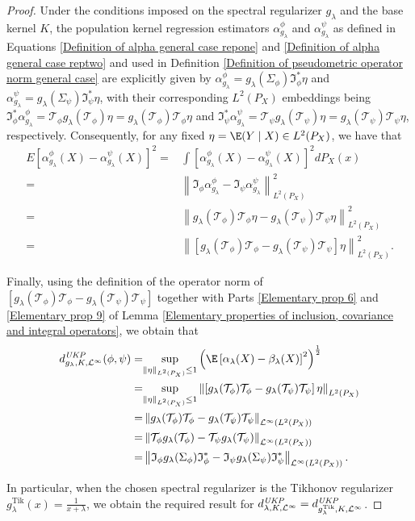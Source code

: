 \documentclass{article} %
\newcommand{\I}{\mathfrak{I}}
\newcommand{\repone}{\phi}
\newcommand{\reptwo}{\psi}
\newcommand{\Sone}{\Sigma_{\repone}}
\newcommand{\Stwo}{\Sigma_{\reptwo}}
\newcommand{\Tone}{\mathcal{T}_{\repone}}
\newcommand{\Ttwo}{\mathcal{T}_{\reptwo}}
\newcommand{\Irepone}{\I_{\repone}}
\newcommand{\Ireptwo}{\I_{\reptwo}}
\newcommand{\Ireponead}{\Irepone^{*}}
\newcommand{\Ireptwoad}{\Ireptwo^{*}}
\newcommand{\gl}{g_{\lambda}}
\newcommand{\glTik}{\gl^{\operatorname{Tik}}}
\newcommand{\norm}[1]{\left\|#1\right\|}
\newcommand{\LPtwo}{L^{2}(P_{X})}
\newcommand{\optwo}{\mathcal{L}^{\infty}(\LPtwo)}
\newcommand{\metricstname}{UKP }
\newcommand{\dop}{d_{\lambda,K,\mathcal{L}^{\infty}}^{\emph{\metricstname}}}
\newcommand{\dopgl}{d_{\gl,K,\mathcal{L}^{\infty}}^{\emph{\metricstname}}}
\newcommand{\dopglTik}{d_{\glTik,K,\mathcal{L}^{\infty}}^{\emph{\metricstname}}}
\theoremstyle{plain}
\begin{document}
\begin{proof}
        Under the conditions imposed on the spectral regularizer $\gl$ and the base kernel $K$,  the population kernel regression estimators $\alpha_{\gl}^{\repone}$ and $\alpha_{\gl}^{\reptwo}$ as defined in Equations \ref{Definition of alpha general case repone} and \ref{Definition of alpha general case reptwo} and used in Definition \ref{Definition of pseudometric operator norm general case} are explicitly given by $\alpha_{\gl}^{\repone} = \gl(\Sone) \Ireponead \eta$ and $\alpha_{\gl}^{\reptwo} = \gl(\Stwo) \Ireptwoad \eta$, with their corresponding $\LPtwo$ embeddings being $\Ireponead \alpha_{\gl}^{\repone}=\Tone \gl(\Tone) \eta =  \gl(\Tone) \Tone \eta$ and $\Ireptwoad \alpha_{\gl}^{\reptwo}=\Ttwo \gl(\Ttwo) \eta =  \gl(\Ttwo) \Ttwo \eta$, respectively. Consequently, for any fixed $\eta = \E(Y \mid X) \in \LPtwo$, we have that
    \[
    \begin{aligned}
    E\left[\alpha_{\gl}^{\repone}(X) -\alpha_{\gl}^{\reptwo}(X)\right]^{2}=& \int \left[\alpha_{\gl}^{\repone}(X) -\alpha_{\gl}^{\reptwo}(X)\right]^{2}dP_X(x)\\
    =&\norm{\Irepone \alpha_{\gl}^{\repone} - \Ireptwo \alpha_{\gl}^{\reptwo}}_{\LPtwo}^{2}\\
    =& \norm{\gl(\Tone)\Tone\eta - \gl(\Ttwo) \Ttwo \eta}_{\LPtwo}^{2}\\
    =& \norm{\left[\gl(\Tone)\Tone - \gl(\Ttwo) \Ttwo \right]\eta}_{\LPtwo}^{2}.
    \end{aligned}
    \]

    Finally, using the definition of the operator norm of $\left[\gl(\Tone)\Tone - \gl(\Ttwo) \Ttwo \right]$ together with Parts \ref{Elementary prop 6} and \ref{Elementary prop 9} of Lemma \ref{Elementary properties of inclusion, covariance and integral operators}, we obtain that
    \[
    \begin{aligned}
        \dopgl(\repone,\reptwo) =& \underset{\norm{\eta}_{\LPtwo} \leq 1}{\sup} \left(\E\left[\alpha_{\lambda}(X)-\beta_{\lambda}(X)\right]^{2}\right)^{\frac{1}{2}}\\
        =& \underset{\norm{\eta}_{\LPtwo} \leq 1}{\sup} \norm{\left[\gl(\Tone)\Tone - \gl(\Ttwo) \Ttwo \right]\eta}_{\LPtwo}\\
        =& \norm{\gl(\Tone) \Tone - \gl(\Ttwo) \Ttwo}_{\optwo} \\
         =& \norm{ \Tone \gl(\Tone) -  \Ttwo \gl(\Ttwo)}_{\optwo} \\
         =& \norm{ \Irepone \gl(\Sone) \Ireponead -  \Ireptwo \gl(\Stwo) \Ireptwoad }_{\optwo}.
    \end{aligned}
    \]

    In particular, when the chosen spectral regularizer is the Tikhonov regularizer $\glTik(x) = \frac{1}{x+\lambda}$, we obtain the required result for $\dop = \dopglTik$.
        
\end{proof}
\end{document}
